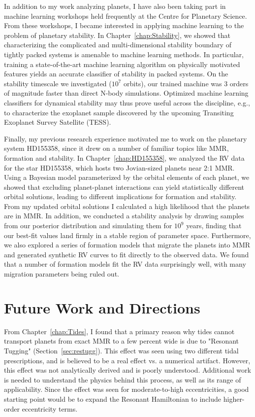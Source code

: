 In addition to my work analyzing \kep planets, I have also been taking part in machine learning workshops held frequently at the Centre for Planetary Science. 
From these workshops, I became interested in applying machine learning to the problem of planetary stability. 
In Chapter~\ref{chap:Stability}, we showed that characterizing the complicated and multi-dimensional stability boundary of tightly packed systems is amenable to machine learning methods. 
In particular, training a state-of-the-art machine learning algorithm on physically motivated features yields an accurate classifier of stability in packed systems. 
On the stability timescale we investigated ($10^7$ orbits), our trained machine was 3 orders of magnitude faster than direct N-body simulations. 
Optimized machine learning classifiers for dynamical stability may thus prove useful across the discipline, e.g., to characterize the exoplanet sample discovered by the upcoming Transiting Exoplanet Survey Satellite (TESS).

Finally, my previous research experience motivated me to work on the planetary system HD155358, since it drew on a number of familiar topics like MMR, formation and stability. 
In Chapter~\ref{chap:HD155358}, we analyzed the RV data for the star HD155358, which hosts two Jovian-sized planets near 2:1 MMR. 
Using a Bayesian model parameterized by the orbital elements of each planet, we showed that excluding planet-planet interactions can yield statistically different orbital solutions, leading to different implications for formation and stability. 
From my updated orbital solutions I calculated a high likelihood that the planets are in MMR. 
In addition, we conducted a stability analysis by drawing samples from our posterior distribution and simulating them for $10^9$ years, finding that our best-fit values land firmly in a stable region of parameter space.
Furthermore, we also explored a series of formation models that migrate the planets into MMR and generated synthetic RV curves to fit directly to the observed data. 
We found that a number of formation models fit the RV data surprisingly well, with many migration parameters being ruled out.

\section{Future Work and Directions}
\label{sec:Future}
From Chapter~\ref{chap:Tides}, I found that a primary reason why tides cannot transport planets from exact MMR to a few percent wide is due to "Resonant Tugging" (Section~\ref{sec:restugg}).
This effect was seen using two different tidal prescriptions, and is believed to be a real effect vs. a numerical artifact. 
However, this effect was not analytically derived and is poorly understood. 
Additional work is needed to understand the physics behind this process, as well as its range of applicability.
Since the effect was seen for moderate-to-high eccentricities, a good starting point would be to expand the Resonant Hamiltonian to include higher-order eccentricity terms. 

